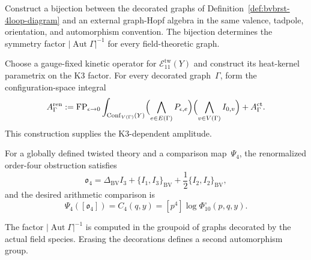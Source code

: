 \begin{problem}
\label{prop:bvbrst-kreimer-count}
Construct a bijection between the decorated graphs of
Definition~\ref{def:bvbrst-4loop-diagram} and an external graph-Hopf
algebra in the same valence, tadpole, orientation, and automorphism
convention.  The bijection determines the symmetry factor
$|\operatorname{Aut}\Gamma|^{-1}$ for every field-theoretic graph.
\end{problem}

\begin{problem}
\label{prop:bvbrst-k3-green-integrals}
Choose a gauge-fixed kinetic operator for
$\mathcal E_{11}^{\mathrm{tw}}(Y)$ and construct its heat-kernel
parametrix on the K3 factor.  For every decorated graph~$\Gamma$, form
the configuration-space integral
\begin{equation}\label{eq:bvbrst-k3-green-powers}
 A_\Gamma^{\mathrm{ren}}
 :=\operatorname{FP}_{\epsilon\to0}
 \int_{\operatorname{Conf}_{V(\Gamma)}(Y)}
 \Bigl(\bigwedge_{e\in E(\Gamma)}P_{\epsilon,e}\Bigr)
 \Bigl(\bigwedge_{v\in V(\Gamma)}I_{0,v}\Bigr)
 +A_\Gamma^{\mathrm{ct}}.
\end{equation}
This construction supplies the K3-dependent amplitude.
\end{problem}

\begin{conjecture}
\label{thm:bvbrst-4loop-feynman-sum}
For a globally defined twisted theory and a comparison map~$\Psi_4$,
the renormalized order-four obstruction satisfies
\begin{equation}\label{eq:bvbrst-4loop-table}
 \mathfrak o_4=
 \Delta_{\mathrm{BV}}I_3+\{I_1,I_3\}_{\mathrm{BV}}
 +\frac12\{I_2,I_2\}_{\mathrm{BV}},
\end{equation}
and the desired arithmetic comparison is
\begin{equation}\label{eq:bvbrst-4loop-sum}
 \Psi_4([\mathfrak o_4])=C_4(q,y)
 =[p^4]\log\Phi_{10}^{\circ}(p,q,y).
\end{equation}
\end{conjecture}

\begin{remark}
\label{rem:bvbrst-4loop-sym-kreimer}
The factor $|\operatorname{Aut}\Gamma|^{-1}$ is computed in the
groupoid of graphs decorated by the actual field species.  Erasing
the decorations defines a second automorphism group.
\end{remark}

